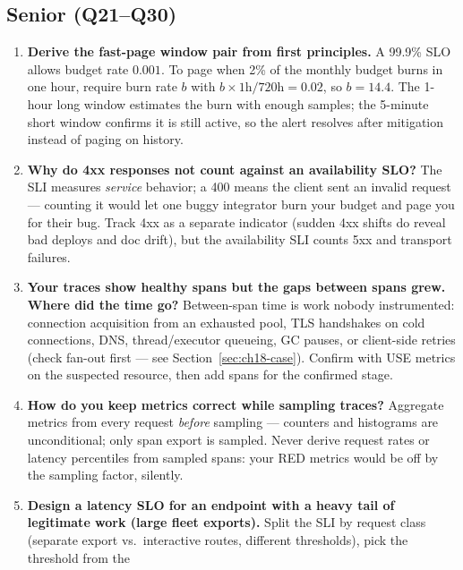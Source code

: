 \subsection*{Senior (Q21--Q30)}
\begin{enumerate}[label=\textbf{Q\arabic*.}, leftmargin=1.6cm, start=21]
  \item \textbf{Derive the fast-page window pair from first principles.}
        A 99.9\% SLO allows budget rate $0.001$. To page when 2\% of the
        monthly budget burns in one hour, require burn rate $b$ with
        $b \times 1\text{h} / 720\text{h} = 0.02$, so $b = 14.4$. The 1-hour
        long window estimates the burn with enough samples; the 5-minute
        short window confirms it is still active, so the alert resolves
        after mitigation instead of paging on history.
  \item \textbf{Why do 4xx responses not count against an availability
        SLO?}
        The SLI measures \emph{service} behavior; a 400 means the client
        sent an invalid request --- counting it would let one buggy
        integrator burn your budget and page you for their bug. Track 4xx
        as a separate indicator (sudden 4xx shifts do reveal bad deploys
        and doc drift), but the availability SLI counts 5xx and transport
        failures.
  \item \textbf{Your traces show healthy spans but the gaps between spans
        grew. Where did the time go?}
        Between-span time is work nobody instrumented: connection
        acquisition from an exhausted pool, TLS handshakes on cold
        connections, DNS, thread/executor queueing, GC pauses, or
        client-side retries (check fan-out first --- see
        Section~\ref{sec:ch18-case}). Confirm with USE metrics on the
        suspected resource, then add spans for the confirmed stage.
  \item \textbf{How do you keep metrics correct while sampling traces?}
        Aggregate metrics from every request \emph{before} sampling ---
        counters and histograms are unconditional; only span export is
        sampled. Never derive request rates or latency percentiles from
        sampled spans: your RED metrics would be off by the sampling
        factor, silently.
  \item \textbf{Design a latency SLO for an endpoint with a heavy tail of
        legitimate work (large fleet exports).}
        Split the SLI by request class (separate export vs.\ interactive
        routes, different thresholds), pick the threshold from the

\end{enumerate}
